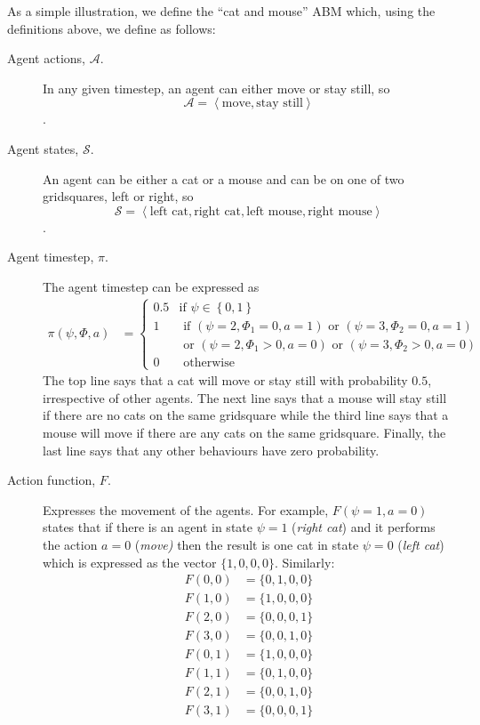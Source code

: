 \documentclass{article}
\begin{document}
As a simple illustration, we define the ``cat and mouse'' ABM which, using the definitions above, we define as follows: 
\begin{description}
	\item[Agent actions, $\mathcal{A}$.] In any given timestep, an agent can either move or stay still, so \[\mathcal{A} = \left<\textrm{move}, \textrm{stay still}\right>\].
	
	\item[Agent states, $\mathcal{S}$.] An agent can be either a cat or a mouse and can be on one of two gridsquares, left or right, so \[\mathcal{S} = \left<\textrm{left cat}, \textrm{right cat}, \textrm{left mouse}, \textrm{right mouse} \right>\]. 
	
	\item[Agent timestep, $\pi$.] The agent timestep can be expressed as
	\[
	\begin{aligned}
	\pi(\psi, \Phi, a) &=
	\begin{cases}
	0.5 & \text{if } \psi \in \left\{0, 1\right\}\\  %
	1 & \text{ if }(\psi = 2, \Phi_1 = 0, a=1) \text{ or } (\psi=3, \Phi_2 = 0, a=1)\\
	& \text{ or } (\psi = 2, \Phi_1 > 0, a=0) \text{ or } (\psi=3, \Phi_2 > 0, a=0)\\
	0 & \text{ otherwise}
	\end{cases}
	\end{aligned}
	\]
	 The top line says that a cat will move or stay still with probability $0.5$, irrespective of other agents. The next line says that a mouse will stay still if there are no cats on the same gridsquare while the third line says that a mouse will move if there are any cats on the same gridsquare. Finally, the last line says that any other behaviours have zero probability.

\item[Action function, $F$.] Expresses the movement of the agents. For example, $F(\psi=1, a=0)$ states that if there is an agent in state $\psi=1$ (\textit{right cat}) and it performs the action $a=0$ (\textit{move)} then the result is one cat in state $\psi=0$ (\textit{left cat}) which is expressed as the vector $\{1,0,0,0\}$. Similarly:
\[
\begin{aligned}
F(0, 0) &= \{0,1,0,0\}\\
F(1, 0) &= \{1,0,0,0\}\\
F(2, 0) &= \{0,0,0,1\}\\
F(3, 0) &= \{0,0,1,0\}\\
F(0, 1) &= \{1,0,0,0\}\\
F(1, 1) &= \{0,1,0,0\}\\
F(2, 1) &= \{0,0,1,0\}\\
F(3, 1) &= \{0,0,0,1\}\\
\end{aligned}
\]

\end{description}
\end{document}
